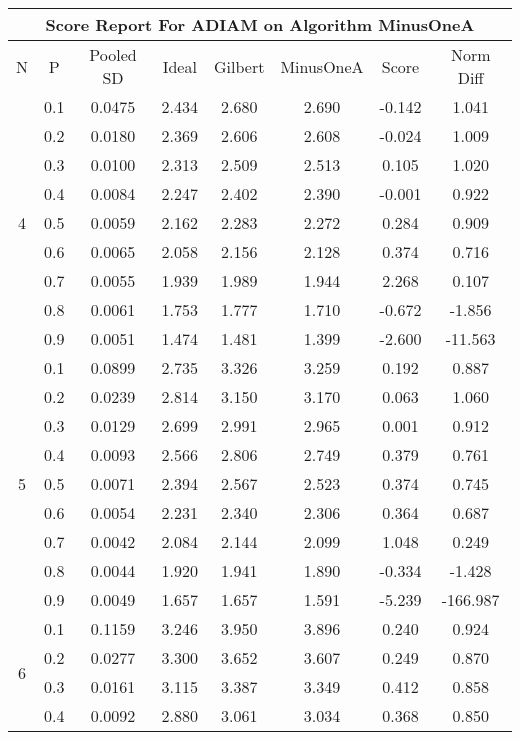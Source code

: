 \documentclass[11pt,a4paper]{report}
\begin{document}
\begin{longtable}{ | c | c || c | c | c | c | c | c | }
\hline
\multicolumn{8}{|c|}{ Score Report For ADIAM on Algorithm MinusOneA} \\
\hline
N & P & Pooled SD &  Ideal &  Gilbert & MinusOneA  & Score & Norm Diff \\
 \hline
 \hline
 \endhead
\multirow{9}{*}{4} & 0.1 & 0.0475 & 2.434 & 2.680 & 2.690 & -0.142 & 1.041 \\
 & 0.2 & 0.0180 & 2.369 & 2.606 & 2.608 & -0.024 & 1.009 \\
 & 0.3 & 0.0100 & 2.313 & 2.509 & 2.513 & 0.105 & 1.020 \\
 & 0.4 & 0.0084 & 2.247 & 2.402 & 2.390 & -0.001 & 0.922 \\
 & 0.5 & 0.0059 & 2.162 & 2.283 & 2.272 & 0.284 & 0.909 \\
 & 0.6 & 0.0065 & 2.058 & 2.156 & 2.128 & 0.374 & 0.716 \\
 & 0.7 & 0.0055 & 1.939 & 1.989 & 1.944 & 2.268 & 0.107 \\
 & 0.8 & 0.0061 & 1.753 & 1.777 & 1.710 & -0.672 & -1.856 \\
 & 0.9 & 0.0051 & 1.474 & 1.481 & 1.399 & -2.600 & -11.563 \\
 \hline
\multirow{9}{*}{5} & 0.1 & 0.0899 & 2.735 & 3.326 & 3.259 & 0.192 & 0.887 \\
 & 0.2 & 0.0239 & 2.814 & 3.150 & 3.170 & 0.063 & 1.060 \\
 & 0.3 & 0.0129 & 2.699 & 2.991 & 2.965 & 0.001 & 0.912 \\
 & 0.4 & 0.0093 & 2.566 & 2.806 & 2.749 & 0.379 & 0.761 \\
 & 0.5 & 0.0071 & 2.394 & 2.567 & 2.523 & 0.374 & 0.745 \\
 & 0.6 & 0.0054 & 2.231 & 2.340 & 2.306 & 0.364 & 0.687 \\
 & 0.7 & 0.0042 & 2.084 & 2.144 & 2.099 & 1.048 & 0.249 \\
 & 0.8 & 0.0044 & 1.920 & 1.941 & 1.890 & -0.334 & -1.428 \\
 & 0.9 & 0.0049 & 1.657 & 1.657 & 1.591 & -5.239 & -166.987 \\
 \hline
\multirow{9}{*}{6} & 0.1 & 0.1159 & 3.246 & 3.950 & 3.896 & 0.240 & 0.924 \\
 & 0.2 & 0.0277 & 3.300 & 3.652 & 3.607 & 0.249 & 0.870 \\
 & 0.3 & 0.0161 & 3.115 & 3.387 & 3.349 & 0.412 & 0.858 \\
 & 0.4 & 0.0092 & 2.880 & 3.061 & 3.034 & 0.368 & 0.850 \\

\end{longtable}
\end{document}
